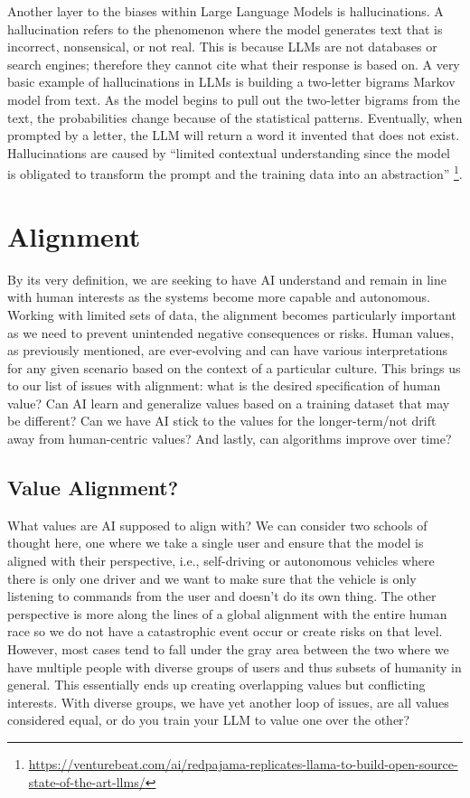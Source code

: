 \documentclass[
]{book}
\begin{document}
Another layer to the biases within Large Language Models is hallucinations. A hallucination refers to the phenomenon where the model generates text that is incorrect, nonsensical, or not real. This is because LLMs are not databases or search engines; therefore they cannot cite what their response is based on. A very basic example of hallucinations in LLMs is building a two-letter bigrams Markov model from text. As the model begins to pull out the two-letter bigrams from the text, the probabilities change because of the statistical patterns. Eventually, when prompted by a letter, the LLM will return a word it invented that does not exist. Hallucinations are caused by ``limited contextual understanding since the model is obligated to transform the prompt and the training data into an abstraction'' \footnote{\url{https://venturebeat.com/ai/redpajama-replicates-llama-to-build-open-source-state-of-the-art-llms/}}.

\hypertarget{alignment}{%
\chapter{Alignment}\label{alignment}}

By its very definition, we are seeking to have AI understand and remain in line with human interests as the systems become more capable and autonomous. Working with limited sets of data, the alignment becomes particularly important as we need to prevent unintended negative consequences or risks. Human values, as previously mentioned, are ever-evolving and can have various interpretations for any given scenario based on the context of a particular culture. This brings us to our list of issues with alignment: what is the desired specification of human value? Can AI learn and generalize values based on a training dataset that may be different? Can we have AI stick to the values for the longer-term/not drift away from human-centric values? And lastly, can algorithms improve over time?

\hypertarget{value-alignment}{%
\section{Value Alignment?}\label{value-alignment}}

What values are AI supposed to align with? We can consider two schools of thought here, one where we take a single user and ensure that the model is aligned with their perspective, i.e., self-driving or autonomous vehicles where there is only one driver and we want to make sure that the vehicle is only listening to commands from the user and doesn't do its own thing. The other perspective is more along the lines of a global alignment with the entire human race so we do not have a catastrophic event occur or create risks on that level. However, most cases tend to fall under the gray area between the two where we have multiple people with diverse groups of users and thus subsets of humanity in general. This essentially ends up creating overlapping values but conflicting interests. With diverse groups, we have yet another loop of issues, are all values considered equal, or do you train your LLM to value one over the other?
\end{document}
